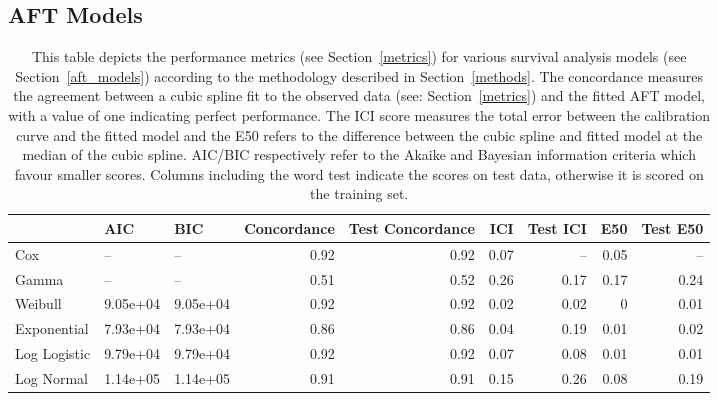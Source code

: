 


\subsection{AFT Models}

\begin{table}
\centering
\begin{tabular}{lllrrrrrr}
\toprule
 & AIC & BIC & Concordance & Test Concordance & ICI & Test ICI & E50 & Test E50 \\
\midrule
Cox & -- & -- & 0.92 & 0.92 & 0.07 & -- & 0.05 & -- \\
Gamma & -- & -- & 0.51 & 0.52 & 0.26 & 0.17 & 0.17 & 0.24 \\
Weibull & 9.05e+04 & 9.05e+04 & 0.92 & 0.92 & 0.02 & 0.02 & 0 & 0.01 \\
Exponential & 7.93e+04 & 7.93e+04 & 0.86 & 0.86 & 0.04 & 0.19 & 0.01 & 0.02 \\
Log Logistic & 9.79e+04 & 9.79e+04 & 0.92 & 0.92 & 0.07 & 0.08 & 0.01 & 0.01 \\
Log Normal & 1.14e+05 & 1.14e+05 & 0.91 & 0.91 & 0.15 & 0.26 & 0.08 & 0.19 \\
\bottomrule
\end{tabular}
\caption{This table depicts the performance metrics (see Section~\ref{metrics}) for various survival analysis models (see Section~\ref{aft_models}) according to the methodology described in Section~\ref{methods}.
The concordance measures the agreement between a cubic spline fit to the observed data
(see: Section~\ref{metrics}) and the fitted AFT model, with a value of one indicating perfect performance.
The ICI score measures the total
error between the calibration curve and the fitted model and the E50 refers to the difference between the cubic spline
and fitted model at the median of the cubic spline.
AIC/BIC respectively refer to the Akaike and Bayesian information criteria which
favour smaller scores.
Columns including the word test indicate the scores on test data, otherwise it is scored on the training set.}
\label{tab:aft_summary}
\end{table}

